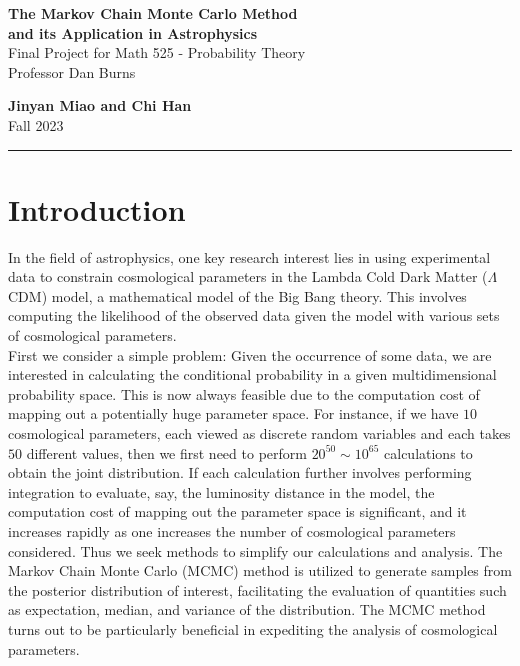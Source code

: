 \documentclass[11pt]{article}
\theoremstyle{break}
\theoremstyle{break}
\begin{document}
	\begin{titlepage}
		\begin{center}
			\vspace*{0.5cm}
			\LARGE \color{black}
				\textbf{The Markov Chain Monte Carlo Method \\and its Application in Astrophysics}\\
			\vspace{1.5cm}			
			\Large \color{gray}
			Final Project for Math 525 - Probability Theory\\
			Professor Dan Burns
			\color{black}
			\vspace{3cm}			
			
			\vspace{6cm}
			\LARGE
			    \textbf{Jinyan Miao and Chi Han} \\
			    \vspace{0.5cm}
				\LARGE Fall 2023\\
			\vspace{1cm}

		\vspace*{\fill}
		\end{center}			
	\end{titlepage}


\newpage
\tableofcontents
\hfill\break
\noindent\rule{8cm}{1pt}
\section{Introduction}
{}\qquad In the field of astrophysics, one key research interest lies in using experimental data to constrain cosmological parameters in the Lambda Cold Dark Matter ($\Lambda$CDM) model, a mathematical model of the Big Bang theory. This involves computing the likelihood of the observed data given the model with various sets of cosmological parameters.\\


{}\qquad First we consider a simple problem: Given the occurrence of some data, we are interested in calculating the conditional probability in a given multidimensional probability space. This is now always feasible due to the computation cost of mapping out a potentially huge parameter space. For instance, if we have $10$ cosmological parameters, each viewed as discrete random variables and each takes $50$ different values, then we first need to perform $20^{50} \sim 10^{65}$ calculations to obtain the joint distribution. If each calculation further involves performing integration to evaluate, say, the luminosity distance in the model, the computation cost of mapping out the parameter space is significant, and it increases rapidly as one increases the number of cosmological parameters considered. Thus we seek methods to simplify our calculations and analysis. The Markov Chain Monte Carlo (MCMC) method is utilized to generate samples from the posterior distribution of interest, facilitating the evaluation of quantities such as expectation, median, and variance of the distribution. The MCMC method turns out to be particularly beneficial in expediting the analysis of cosmological parameters.\\
\end{document}
